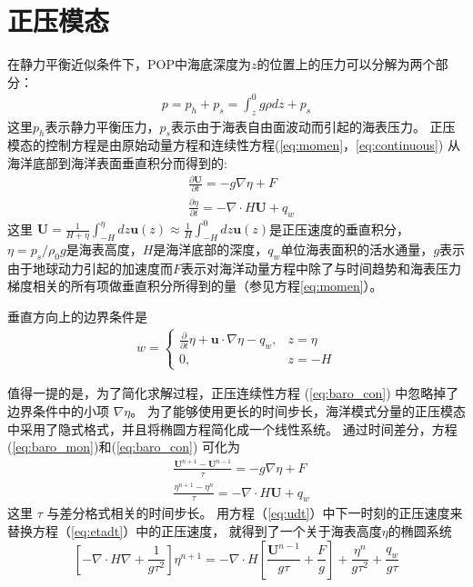 \section{正压模态} \label{solver:mode}


  
在静力平衡近似条件下，POP中海底深度为$z$的位置上的压力可以分解为两个部分：  
\begin{align}
\displaystyle p = p_h + p_s = \int^0_z g\rho dz +p_s
\end{align}
这里$p_h$表示静力平衡压力，$p_s$表示由于海表自由面波动而引起的海表压力。 
正压模态的控制方程是由原始动量方程和连续性方程(\ref{eq:momen}，\ref{eq:continuous}) 从海洋底部到海洋表面垂直积分而得到的:
\begin{align}
&\displaystyle \frac{\partial \textbf{U} }{\partial t}  = -g \nabla \eta + F  \label{eq:baro_mon}\\
&\displaystyle \frac{\partial \eta }{\partial t} = - \nabla \cdot H\textbf{U} + q_w  \label{eq:baro_con}
\end{align}
这里  $\textbf{U} =  \frac{1}{H+\eta}\int_{-H}^\eta dz \textbf{u}(z) \approx \frac{1}{H }\int_{-H}^0 dz \textbf{u}(z)$是正压速度的垂直积分，
$\eta = p_s/{\rho_0g}$是海表高度，$H$是海洋底部的深度，$q_w$单位海表面积的活水通量，$g$表示由于地球动力引起的加速度而$F$表示对海洋动量方程中除了与时间趋势和海表压力梯度相关的所有项做垂直积分所得到的量（参见方程\ref{eq:momen}）。
 
垂直方向上的边界条件是
\begin{align}
\label{eq:bound_w}
w = \left\{ \begin{array}{ll}
\frac{\partial}{\partial t} \eta  +\textbf{u}\cdot\nabla \eta - q_w, & z = \eta  \\
0, & z = -H
\end{array} \right.
\end{align}
 
值得一提的是，为了简化求解过程，正压连续性方程 (\ref{eq:baro_con}) 中忽略掉了边界条件中的小项 $\nabla \eta$\cite{smith2010parallel}。
为了能够使用更长的时间步长，海洋模式分量的正压模态中采用了隐式格式，并且将椭圆方程简化成一个线性系统。 通过时间差分，方程  (\ref{eq:baro_mon})和(\ref{eq:baro_con}) 可化为
\begin{align}
&\displaystyle \frac{ \textbf{U}^{n+1} - \textbf{U}^{n-1}}{\tau}  = -g \nabla \eta + F \label{eq:udt} \\
&\displaystyle \frac{\eta^{n+1} - \eta^n }{\tau}  = - \nabla \cdot H\textbf{U} + q_w \label{eq:etadt}
\end{align}
这里 $\tau$ 与差分格式相关的时间步长。 
用方程（\ref{eq:udt}）中下一时刻的正压速度来替换方程（\ref{eq:etadt}）中的正压速度， 就得到了一个关于海表高度$\eta$的椭圆系统
\begin{equation}
\label{eq:sshdiscret}
     [-\nabla\cdot H \nabla + \frac{1}{g  \tau^2}]\eta^{n+1}
           = -\nabla\cdot H[\frac{\textbf{U}^{n-1}}{g \tau} + \frac{F}{g}] + \frac{\eta^n}{g\tau^2} +\frac{q_w}{g\tau}
\end{equation}
 
